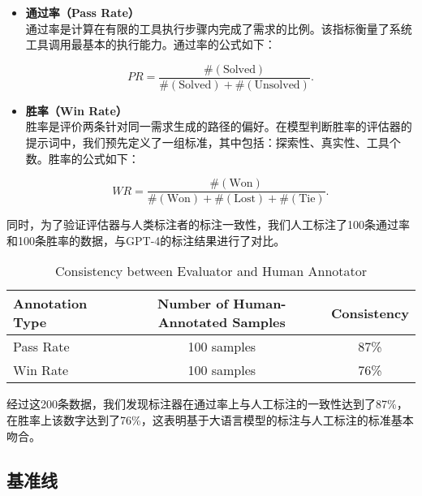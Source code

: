 \begin{itemize}
    \item \textbf{通过率（Pass Rate）} \\
    通过率是计算在有限的工具执行步骤内完成了需求的比例。该指标衡量了系统工具调用最基本的执行能力。通过率的公式如下：

    \begin{equation}
        PR = \frac{ \#(\text{Solved}) }{ \#(\text{Solved}) + \#(\text{Unsolved}) }.
    \end{equation}

    \item \textbf{胜率（Win Rate）} \\
    胜率是评价两条针对同一需求生成的路径的偏好。在模型判断胜率的评估器的提示词中，我们预先定义了一组标准，其中包括：探索性、真实性、工具个数。胜率的公式如下：

    \begin{equation}
        WR = \frac{ \#(\text{Won}) }{ \#(\text{Won}) + \#(\text{Lost}) + \#(\text{Tie}) }.
    \end{equation}

\end{itemize}

同时，为了验证评估器与人类标注者的标注一致性，我们人工标注了100条通过率和100条胜率的数据，与GPT-4的标注结果进行了对比。

\begin{table}[h]
  \centering
  \caption{Consistency between Evaluator and Human Annotator}
  \label{tab:consistency}
  \begin{tabular}{l|c|c}
  \toprule
  \textbf{Annotation Type} & \textbf{Number of Human-Annotated Samples} & \textbf{Consistency} \\ \midrule
  Pass Rate                & 100 samples                                & 87\%                 \\
  Win Rate                 & 100 samples                                & 76\%                 \\ 
  \bottomrule
  \end{tabular}
\end{table}
  
  \noindent

经过这200条数据，我们发现标注器在通过率上与人工标注的一致性达到了87\%，在胜率上该数字达到了76\%，这表明基于大语言模型的标注与人工标注的标准基本吻合。

\subsection{基准线}

